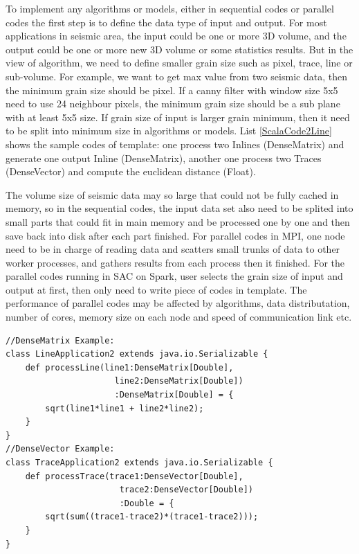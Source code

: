 To implement any algorithms or models, either in sequential codes or parallel codes the first step is to define the data type of input and output. For most applications in seismic area, the input could be one or more 3D volume, and the output could be one or more new 3D volume or some statistics results. But in the view of algorithm, we need to define smaller grain size such as pixel, trace, line or sub-volume. For example, we want to get max value from two seismic data, then the minimum grain size should be pixel. If a canny filter with window size 5x5 need to use 24 neighbour pixels, the minimum grain size should be a sub plane with at least 5x5 size. If grain size of input is larger grain minimum, then it need to be split into minimum size in algorithms or models. List \ref{ScalaCode2Line} shows the sample codes of template: one process two Inlines (DenseMatrix) and generate one output Inline (DenseMatrix), another one process two Traces (DenseVector) and compute the euclidean distance (Float). 

The volume size of seismic data may so large that could not be fully cached in memory, so in the sequential codes, the input data set also need to be splited into small parts that could fit in main memory and be processed one by one and then save back into disk after each part finished. For parallel codes in MPI, one node need to be in charge of reading data and scatters small trunks of data to other worker processes, and gathers results from each process then it finished. For the parallel codes running in SAC on Spark, user selects the grain size of input and output at first, then only need to write piece of codes in template. The performance of parallel codes may be affected by algorithms, data distributation, number of cores, memory size on each node and speed of communication link etc. 

\lstset{language=Java,frame=single}
\begin{lstlisting}[float,caption=Sample codes of arighmetic operations on two datasets,label=ScalaCode2Line]
//DenseMatrix Example:
class LineApplication2 extends java.io.Serializable {
    def processLine(line1:DenseMatrix[Double],
                      line2:DenseMatrix[Double])
                      :DenseMatrix[Double] = {
        sqrt(line1*line1 + line2*line2); 
    }
}
//DenseVector Example:
class TraceApplication2 extends java.io.Serializable {
    def processTrace(trace1:DenseVector[Double],
                       trace2:DenseVector[Double])
                       :Double = {
        sqrt(sum((trace1-trace2)*(trace1-trace2))); 
    }
}
\end{lstlisting}

